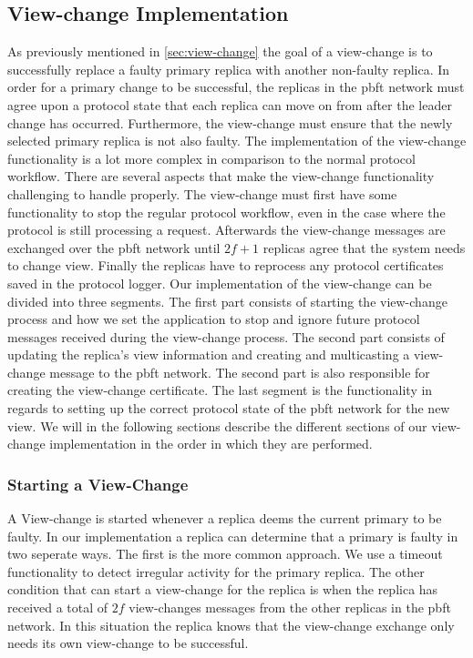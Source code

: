\subsection{View-change Implementation}
As previously mentioned in \autoref{sec:view-change} the goal of a view-change is to successfully replace a faulty primary replica with another non-faulty replica. In order for a primary change to be successful, the replicas in the \ac{pbft} network must agree upon a  protocol state that each replica can move on from after the leader change has occurred. Furthermore, the view-change must ensure that the newly selected primary replica is not also faulty. The implementation of the view-change functionality is a lot more complex in comparison to the normal protocol workflow. There are several aspects that make the view-change functionality challenging to handle properly. The view-change must first have some functionality to stop the regular protocol workflow, even in the case where the protocol is still processing a request. Afterwards the view-change messages are exchanged over the \ac{pbft} network until $2f+1$ replicas agree that the system needs to change view. Finally the replicas have to reprocess any protocol certificates saved in the protocol logger. Our implementation of the view-change can be divided into three segments. The first part consists of starting the view-change process and how we set the application to stop and ignore future protocol messages received during the view-change process. The second part consists of updating the replica's view information and creating and multicasting a view-change message to the \ac{pbft} network. The second part is also responsible for creating the view-change certificate. The last segment is the functionality in regards to setting up the correct protocol state of the \ac{pbft} network for the new view.
We will in the following sections describe the different sections of our view-change implementation in the order in which they are performed.

\subsubsection{Starting a View-Change}

A View-change is started whenever a replica deems the current primary to be faulty. In our implementation a replica can determine that a primary is faulty in two seperate ways. The first is the more common approach. We use a timeout functionality to detect irregular activity for the primary replica. The other condition that can start a view-change for the replica is when the replica has received a total of $2f$ view-changes messages from the other replicas in the \ac{pbft} network. In this situation the replica knows that the view-change exchange only needs its own view-change to be successful. 

